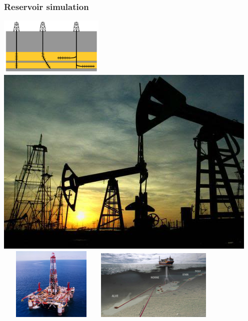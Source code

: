 \documentclass[handout]{beamer}
{
\usepackage{fullpage}
\usepackage{hyperref}
\usepackage{amssymb} 
}
\begin{document}
\begin{frame}
\frametitle{Reservoir simulation}
  \begin{center}
   \includegraphics[width=5cm,height=4.cm]{figures/WellTypes.png}
   \hfill
   \includegraphics[height=4.cm]{figures/oil-field-tmr.jpg}
   \vfill
   \includegraphics[width=5cm,height=3.5cm]{figures/Offshore.jpg}
   \hfill
   \includegraphics[height=3.4cm]{figures/Norne.png}
  \end{center}
\end{frame}
\end{document}
